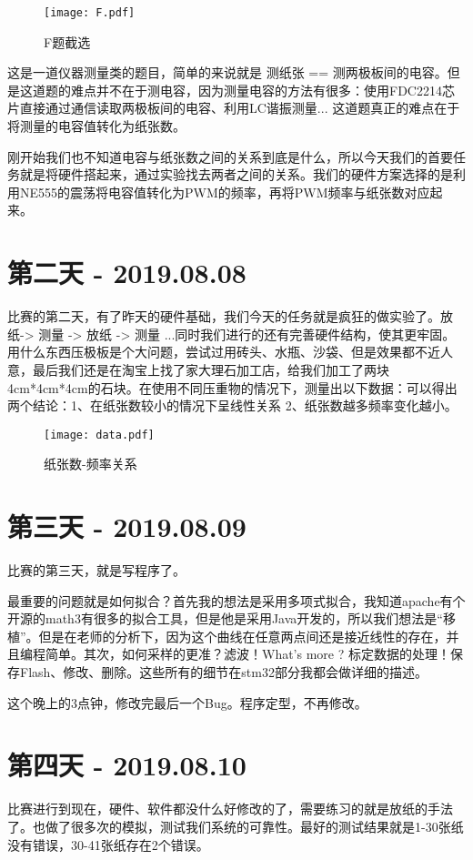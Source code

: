 \documentclass[cn,11pt]{elegantbook}
\begin{document}
\begin{figure}[htbp]
	\centering
	\texttt{[image: F.pdf]}
	\caption{F题截选 \label{fig:scatter}}
\end{figure}


这是一道仪器测量类的题目，简单的来说就是 测纸张 == 测两极板间的电容。但是这道题的难点并不在于测电容，因为测量电容的方法有很多：使用FDC2214芯片直接通过通信读取两极板间的电容、利用LC谐振测量... 这道题真正的难点在于将测量的电容值转化为纸张数。

刚开始我们也不知道电容与纸张数之间的关系到底是什么，所以今天我们的首要任务就是将硬件搭起来，通过实验找去两者之间的关系。我们的硬件方案选择的是利用NE555的震荡将电容值转化为PWM的频率，再将PWM频率与纸张数对应起来。


\section{第二天 - 2019.08.08}

比赛的第二天，有了昨天的硬件基础，我们今天的任务就是疯狂的做实验了。放纸-> 测量 -> 放纸 -> 测量 ...同时我们进行的还有完善硬件结构，使其更牢固。用什么东西压极板是个大问题，尝试过用砖头、水瓶、沙袋、但是效果都不近人意，最后我们还是在淘宝上找了家大理石加工店，给我们加工了两块4cm*4cm*4cm的石块。在使用不同压重物的情况下，测量出以下数据：可以得出两个结论：1、在纸张数较小的情况下呈线性关系 2、纸张数越多频率变化越小。

\begin{figure}[htbp]
	\centering
	\texttt{[image: data.pdf]}
	\caption{纸张数-频率关系 \label{fig:scatter}}
\end{figure}

\section{第三天 - 2019.08.09}
比赛的第三天，就是写程序了。

最重要的问题就是如何拟合？首先我的想法是采用多项式拟合，我知道apache有个开源的math3有很多的拟合工具，但是他是采用Java开发的，所以我们想法是“移植”。但是在老师的分析下，因为这个曲线在任意两点间还是接近线性的存在，并且编程简单。其次，如何采样的更准？滤波！What's more ? 标定数据的处理！保存Flash、修改、删除。这些所有的细节在stm32部分我都会做详细的描述。

这个晚上的3点钟，修改完最后一个Bug。程序定型，不再修改。


\section{第四天 - 2019.08.10}
比赛进行到现在，硬件、软件都没什么好修改的了，需要练习的就是放纸的手法了。也做了很多次的模拟，测试我们系统的可靠性。最好的测试结果就是1-30张纸没有错误，30-41张纸存在2个错误。
\end{document}
